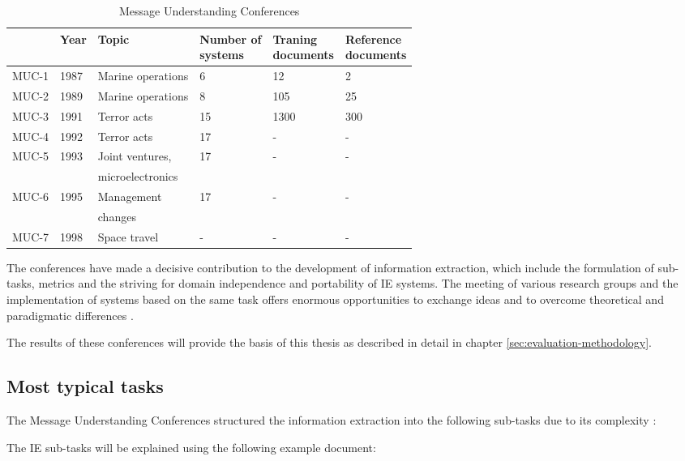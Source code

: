 \begin{table}[H]
\centering
\begin{tabular*}{\textwidth}{ l l l l l l }
	\toprule
	& Year & Topic & \shortstack{Number of \\ systems} & \shortstack{Traning \\ documents} & \shortstack{Reference \\ documents} \\
	\midrule
	MUC-1 & 1987 & Marine operations & 6 & 12 & 2 \\
	MUC-2 & 1989 & Marine operations & 8 & 105 & 25 \\
	MUC-3 & 1991 & Terror acts & 15 & 1300 & 300 \\
	MUC-4 & 1992 & Terror acts & 17 & - & - \\
	MUC-5 & 1993 & Joint ventures, & 17 & - & - \\
	& & microelectronics & & & \\
	MUC-6 & 1995 & Management & 17 & - & - \\
	& & changes & & & \\
	MUC-7 & 1998 & Space travel & - & - & - \\
	\bottomrule
\end{tabular*}
\caption{Message Understanding Conferences}
\end{table}

The conferences have made a decisive contribution to the development of information extraction, which include the formulation of sub-tasks, metrics and the striving for domain independence and portability of \gls{IE} systems. The meeting of various research groups and the implementation of systems based on the same task offers enormous opportunities to exchange ideas and to overcome theoretical and paradigmatic differences \cite{Cimiano:2003}\cite{Lehnert:1994}.

The results of these conferences will provide the basis of this thesis as described in detail in chapter \ref{sec:evaluation-methodology}.

\newpage
\subsection{Most typical tasks}

The Message Understanding Conferences structured the information extraction into the following sub-tasks due to its complexity \cite{Carstensen:2010}\cite{Lavelli:2008}:

The \gls{IE} sub-tasks will be explained using the following example document:

